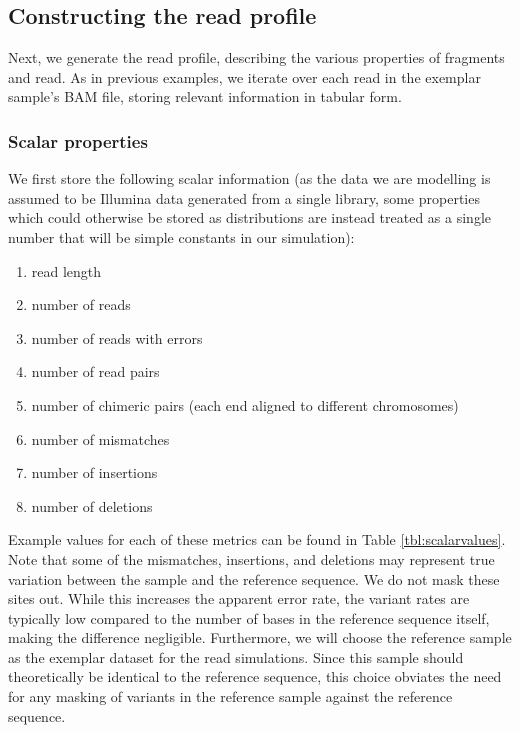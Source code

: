 \subsection{Constructing the read profile}

Next, we generate the read profile, describing the various properties of fragments and read.  As in previous examples, we iterate over each read in the exemplar sample's BAM file, storing relevant information in tabular form.

\subsubsection{Scalar properties}
We first store the following scalar information (as the data we are modelling is assumed to be Illumina data generated from a single library, some properties which could otherwise be stored as distributions are instead treated as a single number that will be simple constants in our simulation):

\begin{enumerate}
    \item read length
    \item number of reads
    \item number of reads with errors
    \item number of read pairs
    \item number of chimeric pairs (each end aligned to different chromosomes)
    \item number of mismatches 
    \item number of insertions
    \item number of deletions
\end{enumerate}

Example values for each of these metrics can be found in Table \ref{tbl:scalarvalues}.  Note that some of the mismatches, insertions, and deletions may represent true variation between the sample and the reference sequence.  We do not mask these sites out.  While this increases the apparent error rate, the variant rates are typically low compared to the number of bases in the reference sequence itself, making the difference negligible.  Furthermore, we will choose the reference sample as the exemplar dataset for the read simulations.  Since this sample should theoretically be identical to the reference sequence, this choice obviates the need for any masking of variants in the reference sample against the reference sequence.

